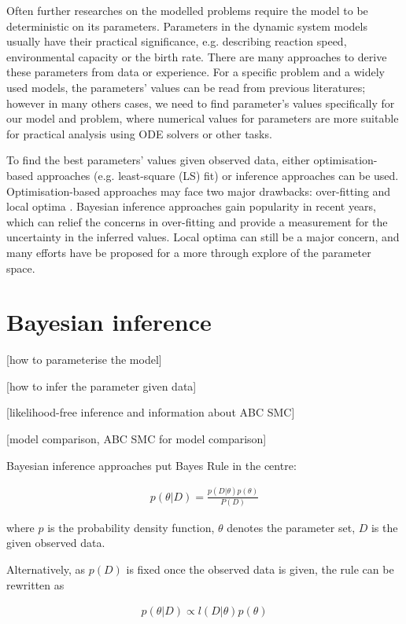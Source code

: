 \documentclass[12pt,a4paper]{report}
\begin{document}
Often further researches on the modelled problems require the model to be deterministic on its parameters. Parameters in the dynamic system models usually have their practical significance, e.g. describing reaction speed, environmental capacity or the birth rate. There are many approaches to derive these parameters from data or experience. For a specific problem and a widely used models, the parameters' values can be read from previous literatures; however in many others cases, we need to find parameter's values specifically for our model and problem, where numerical values for parameters are more suitable for practical analysis using ODE solvers or other tasks.

To find the best parameters' values given observed data, either optimisation-based approaches (e.g. least-square (LS) fit) or inference approaches can be used. Optimisation-based approaches may face two major drawbacks: over-fitting and local optima \cite{ref:abcsysbio}. Bayesian inference approaches gain popularity in recent years, which can relief the concerns in over-fitting and provide a measurement for the uncertainty in the inferred values. Local optima can still be a major concern, and many efforts have be proposed for a more through explore of the parameter space.



\section{Bayesian inference}

 [how to parameterise the model]

 [how to infer the parameter given data]

 [likelihood-free inference and information about ABC SMC]

 [model comparison, ABC SMC for model comparison]

 Bayesian inference approaches put Bayes Rule in the centre:

 \begin{align}
    \label{eq:bayes}
    p(\theta|D) = \frac{p(D|\theta)p(\theta)}{P(D)}
\end{align}

where $p$ is the probability density function, $\theta$ denotes the parameter set, $D$ is the given observed data.

Alternatively, as $p(D)$ is fixed once the observed data is given, the rule can be rewritten as 

\begin{align}
    \label{eq:bayes2}
    p(\theta|D) \propto l(D|\theta)p(\theta)
\end{align}
\end{document}
